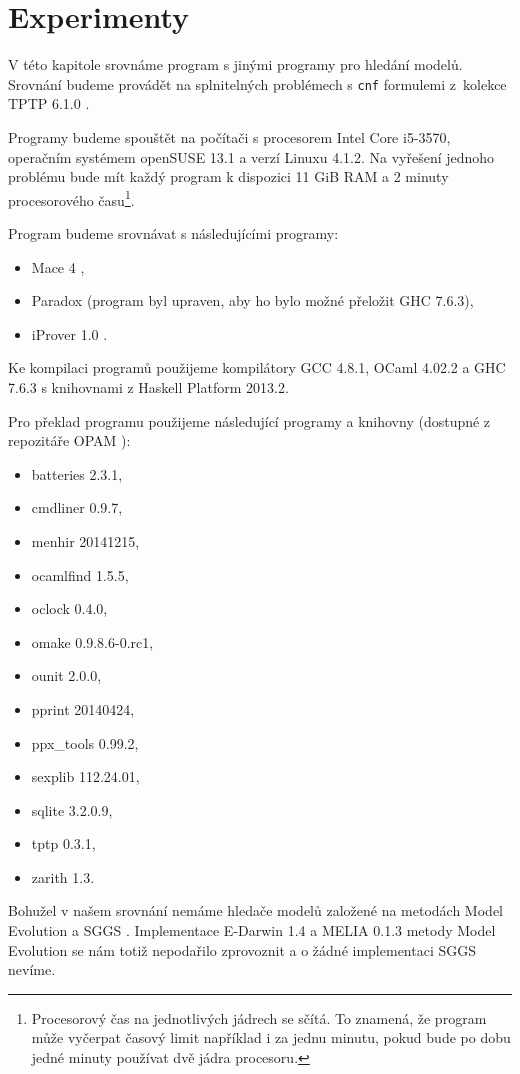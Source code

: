 \chapter{Experimenty}

V této kapitole srovnáme program \crossbow{} s jinými programy
pro hledání modelů. Srovnání budeme provádět na splnitelných problémech
s \texttt{cnf} formulemi z~kolekce TPTP 6.1.0 \cite{sutcliffe2009tptp}.

Programy budeme spouštět na počítači s procesorem
Intel Core i5-3570, ope\-račním systémem openSUSE 13.1 a
verzí Linuxu 4.1.2. Na vyřešení jednoho problému bude mít
každý program k dispozici 11 GiB RAM a 2 minuty procesorového
času\footnote{Procesorový čas na jednotlivých jádrech se sčítá. To
znamená, že program může vyčerpat časový limit například i za jednu minutu,
pokud bude po dobu jedné minuty používat dvě jádra procesoru.}.

Program \crossbow{} budeme srovnávat s následujícími programy:
\begin{itemize}
\item Mace 4 \cite{mccune03mace4},
\item Paradox \cite{paradox} (program byl upraven,
  aby ho bylo možné přeložit GHC 7.6.3),
\item iProver 1.0 \cite{iprover}.
\end{itemize}
Ke kompilaci programů použijeme kompilátory GCC 4.8.1,
OCaml 4.02.2 a GHC 7.6.3 s knihovnami z Haskell Platform 2013.2.

Pro překlad programu \crossbow{} použijeme následující programy
a knihovny (dostupné z repozitáře OPAM \cite{opam}):
\begin{itemize}
\item batteries 2.3.1,
\item cmdliner 0.9.7,
\item menhir 20141215,
\item ocamlfind 1.5.5,
\item oclock 0.4.0,
\item omake 0.9.8.6-0.rc1,
\item ounit 2.0.0,
\item pprint 20140424,
\item ppx\_tools 0.99.2,
\item sexplib 112.24.01,
\item sqlite 3.2.0.9,
\item tptp 0.3.1,
\item zarith 1.3.
\end{itemize}

Bohužel v našem srovnání nemáme hledače modelů
založené na metodách Model Evolution
a SGGS \cite{bonacina2015}.
Implementace E-Darwin 1.4 \cite{edarwin} a MELIA 0.1.3 \cite{melia}
metody Model Evolution se nám totiž nepodařilo zprovoznit
a o žádné implementaci SGGS nevíme.

